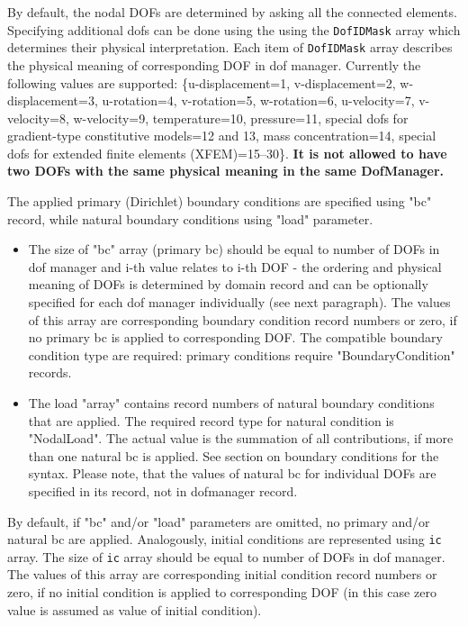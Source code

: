 \documentclass[a4paper]{report}
\newcommand{\param}[1]{\texttt{#1}} %
\begin{document}
By default, the nodal DOFs are determined by asking all the connected elements. Specifying additional dofs can be done using the using the \param{DofIDMask} array which determines their physical interpretation.
Each item of \param{DofIDMask} array describes the physical meaning of corresponding DOF in dof manager. Currently the following values are supported: \{u-displacement=1, v-displacement=2, w-displacement=3, u-rotation=4, v-ro\-ta\-tion=5, w-rotation=6, u-velocity=7, v-velocity=8, w-velocity=9, temperature=10, pressure=11, special dofs for gradient-type constitutive models=12 and 13, mass concentration=14, special dofs for extended finite elements (XFEM)=15--30\}.
\textbf{It is not allowed to have two DOFs with the same physical meaning in the same DofManager.}

The applied primary (Dirichlet) boundary conditions are specified using
"bc" record, while natural boundary conditions using "load" parameter.
\begin{itemize}
\item The size of "bc" array (primary bc) should be equal to number of DOFs in dof manager and i-th value relates to i-th DOF - the ordering and physical meaning of DOFs is determined by domain record and can be optionally specified for each dof manager individually (see next paragraph). The values of this array are corresponding boundary condition record numbers or zero, if no primary bc is applied to corresponding DOF. The compatible boundary condition type are required: primary conditions require "BoundaryCondition" records.
\item The load "array" contains record numbers of natural boundary conditions that are applied. The required record type for natural condition is "NodalLoad". The actual value is the summation of all contributions, if more than one natural bc is applied. See section on boundary conditions for the syntax. Please note, that the values of natural bc for individual DOFs are specified in its record, not in dofmanager record.
\end{itemize}

By default, if "bc" and/or "load" parameters are omitted, no primary and/or natural bc are applied. Analogously, initial conditions are represented using \param{ic} array. The size of \param{ic} array should be equal to number of DOFs in dof manager. The values of this array are corresponding initial condition record numbers or zero, if no initial condition is applied to corresponding DOF (in this case zero value is assumed as value of initial condition).
\end{document}
